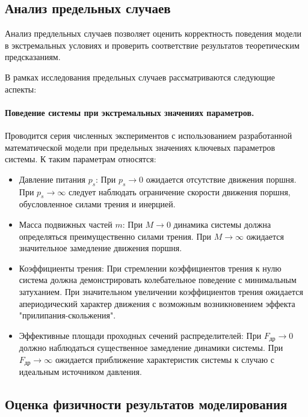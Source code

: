\subsection{Анализ предельных случаев}\label{sec:ch2/sec7/subsec3}

Анализ предлельных случаев позволяет оценить корректность поведения модели в экстремальных условиях
и проверить соответствие результатов теоретическим предсказаниям.

В рамках исследования предельных случаев рассматриваются следующие аспекты:

\paragraph{Поведение системы при экстремальных значениях параметров.}

Проводится серия численных экспериментов с использованием разработанной математической модели
при предельных значениях ключевых параметров системы. К таким параметрам относятся:
\begin{itemize}
    \item Давление питания $p_s$:
          При $p_s \rightarrow 0$ ожидается отсутствие движения поршня.
          При $p_s \rightarrow \infty$ следует наблюдать ограничение скорости движения поршня, обусловленное силами трения и инерцией.
    \item Масса подвижных частей $m$:
          При $M \rightarrow 0$ динамика системы должна определяться преимущественно силами трения.
          При $M \rightarrow \infty$ ожидается значительное замедление движения поршня.
    \item Коэффициенты трения:
          При стремлении коэффициентов трения к нулю система должна демонстрировать колебательное поведение с минимальным затуханием.
          При значительном увеличении коэффициентов трения ожидается апериодический характер движения с возможным возникновением эффекта "прилипания-скольжения".
    \item Эффективные площади проходных сечений распределителей:
          При $F_\text{др} \rightarrow 0$ должно наблюдаться существенное замедление динамики системы.
          При $F_\text{др} \rightarrow \infty$ ожидается приближение характеристик системы к случаю с идеальным источником давления.
\end{itemize}

\subsection{Оценка физичности результатов моделирования}\label{sec:ch2/sec7/subsec4}

